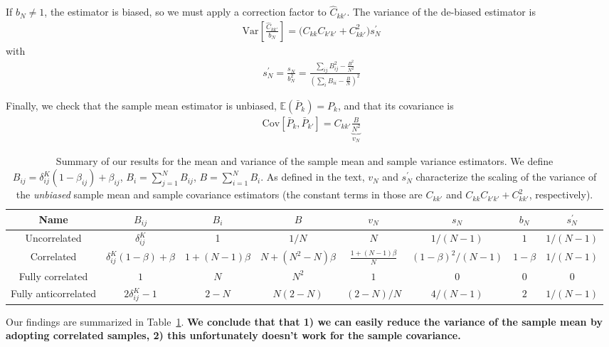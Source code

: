 \documentclass{aastex6}
\newcommand{\eqn}[1]{\begin{eqnarray}#1\end{eqnarray}}
\begin{document}
If $b_N\neq 1$, the estimator is biased, so we must apply a correction factor to $\hat{C}_{kk'}$.
The variance of the de-biased estimator is
\eqn{
	 \mathrm{Var}\left[ \frac{\hat{C}_{kk'}}{b_N}\right]  = \bigl(C_{kk}C_{k'k'} + C_{kk'}^2 \bigr) s_N^\prime  \label{ref:samplecovariancevariance}
}
with 
\eqn{
	s_N^\prime  = \frac{s_N}{b^2_N} =  \frac{ \sum_{ij} B_{ij}^2  - \frac{B^2}{N^2}}{ \left(\sum_i B_{ii} - \frac{B}{N}\right)^2 }
	}

Finally, we check that the sample mean estimator is unbiased, $\mathbb{E}(\bar{P}_k) = P_k$, and that its covariance is
\eqn{
	\mathrm{Cov}[\bar{P}_k, \bar{P}_{k'}] = C_{kk'} \underbrace{ \frac{B}{N^2} }_{v_N}
}

\begin{table}\centering
\begin{tabular}{|c|c|c|c|c|c|c|c|}
	\hline	Name	& $B_{ij}$	&	$B_{i}$	&	$B$	&	$v_N$	&	$s_N $ 	&	$b_N$	&	$s_N^\prime$	\\\hline
	Uncorrelated	&$ \delta^K_{ij}$		&	1	&	$1/N$	&	$N$	&	$1/(N-1)$	&	$1$	&	$1/(N-1)$	\\
	Correlated	&$\delta^K_{ij}(1-\beta) + \beta$		&	$1 + (N-1)\beta$	&	$N + (N^2-N)\beta$	&	$\frac{1 + (N-1)\beta}{N}$	&	$(1-\beta)^2/(N-1)$	&	$1-\beta$	&	$1/(N-1)$	\\
	Fully correlated	&$ 1$		&	$N$	&	$N^2$	&	$1$	&	$0$	&$0$		&	$0$	\\
	Fully anticorrelated	&$2 \delta^K_{ij} - 1$		&	$2-N$	&	$N(2-N)$	&	$(2-N)/N$	&	$4/(N-1)$	&	$2$	&	$1/(N-1)$	\\
	\hline
\end{tabular}	
\caption{Summary of our results for the mean and variance of the sample mean and sample variance estimators. We define $B_{ij} =  \delta^K_{ij}(1-\beta_{ij}) + \beta_{ij}$, $B_i=\sum_{j=1}^NB_{ij}$, $B=\sum_{i=1}^NB_{i}$. As defined in the text, $v_N$ and $s_N^\prime$ characterize the scaling of the variance of the \textit{unbiased} sample mean and sample covariance estimators (the constant terms in those are $C_{kk'}$ and $C_{kk}C_{k'k'} + C_{kk'}^2$, respectively). 
}
\label{table:correlateddrawbiasesandvariances}
\end{table}

Our findings are summarized in Table~\ref{table:correlateddrawbiasesandvariances}. \textbf{We conclude that that 1) we can easily reduce the variance of the sample mean by adopting correlated samples, 2) this unfortunately doesn't work for the sample covariance.}

\end{document}
